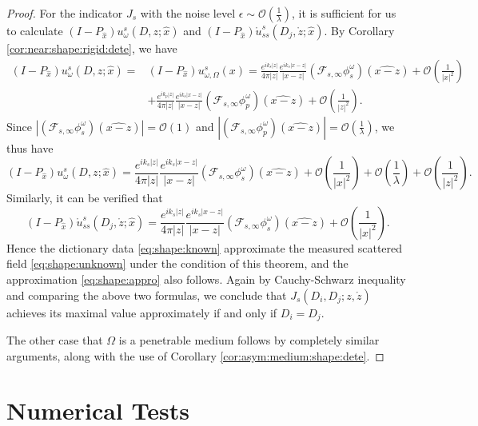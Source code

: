 \documentclass[a4paper,11pt]{article}
\newcommand{\mO}{\mathcal{O}}
\theoremstyle{remark}
\theoremstyle{definition}
\numberwithin{equation}{section}
\begin{document}
\begin{proof}
For the indicator $J_s$ with the noise level $ \epsilon \sim \mO(\frac{1}{\lambda})$, it is sufficient for us to calculate $(I - P_{\hat{x}}) u_{\omega}^{s}(D,z;\hat{x})$ and $(I - P_{\hat{x}})\mathring{u}_{ss}^{s}(D_j,\mathring{z};\hat{x})$. By Corollary \ref{cor:near:shape:rigid:dete}, we have
\begin{align*}
(I - P_{\hat{x}})u_{\omega}^{s}(D,z;\hat{x}) =& (I - P_{\hat{x}}) u_{\omega,\Omega}^s(x)
 = \frac{e^{ik_s|z|}}{4 \pi |z|}  \frac{e^{ik_s|x-z|}}{|x-z|} (\mathcal{F}_{s,\infty}\phi_{s}^\omega)(\widehat{x-z}) + \mathcal{O}(\frac{1}{|x|^2}) \\
 &+\frac{e^{ik_p|z|}}{4 \pi |z|}  \frac{e^{ik_s|x-z|}}{|x-z|}  (\mathcal{F}_{s,\infty}\phi_{p}^\omega)(\widehat{x-z}) + \mO(\frac{1}{|z|^2}).
\end{align*}
Since $|(\mathcal{F}_{s,\infty}\phi_{s}^\omega)(\widehat{x-z}) |= \mO(1)$ and $|(\mathcal{F}_{s,\infty}\phi_{p}^\omega)(\widehat{x-z})| = \mO(\frac{1}{\lambda})$, we thus have
\begin{equation}\label{eq:shape:unknown}
(I - P_{\hat{x}})u_{\omega}^{s}(D,z;\hat{x})  = \frac{e^{ik_s|z|}}{4 \pi |z|} \frac{e^{ik_s|x-z|}}{|x-z|} (\mathcal{F}_{s,\infty}\phi_{s}^\omega)(\widehat{x-z}) + \mathcal{O}(\frac{1}{|x|^2}) + \mO(\frac{1}{\lambda}) +  \mathcal{O}(\frac{1}{|z|^2}).
\end{equation}
Similarly,  it can be verified that
\begin{equation}\label{eq:shape:known}
(I - P_{\hat{x}})\mathring{u}_{ss}^{s}(D_j,\mathring{z};\hat{x}) = \frac{e^{ik_s|z|}}{4 \pi |z|}  \frac{e^{ik_s|x-z|}}{|x-z|} (\mathcal{F}_{s,\infty}\phi_{s}^\omega)(\widehat{x-z}) + \mathcal{O}(\frac{1}{|x|^2}).
\end{equation}
Hence the dictionary data \eqref{eq:shape:known} approximate the measured scattered field \eqref{eq:shape:unknown} under the condition of this theorem, and the approximation \eqref{eq:shape:appro} also follows.
Again by Cauchy-Schwarz inequality and comparing the above two formulas, we conclude that $J_{s}(D_i,D_j;z, \mathring{z})$ achieves its maximal value approximately if and only if $D_i = D_j$.

The other case that $\Omega$ is a penetrable medium follows by completely similar arguments, along with the use of Corollary \ref{cor:asym:medium:shape:dete}.
\end{proof}



\section{Numerical Tests}\label{sec:num}
\end{document}
